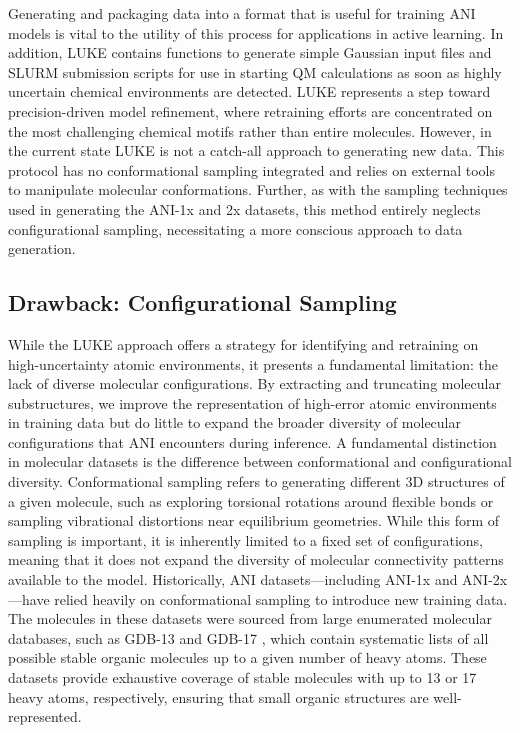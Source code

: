 Generating and packaging data into a format that is useful for training ANI models is vital to the utility of this process for applications in active learning.
In addition, LUKE contains functions to generate simple Gaussian \cite{gaussian16} input files and SLURM \cite{slurm} submission scripts for use in starting QM calculations as soon as highly uncertain chemical environments are detected.
LUKE represents a step toward precision-driven model refinement, where retraining efforts are concentrated on the most challenging chemical motifs rather than entire molecules. 
However, in the current state LUKE is not a catch-all approach to generating new data.
This protocol has no conformational sampling integrated and relies on external tools to manipulate molecular conformations.
Further, as with the sampling techniques used in generating the ANI-1x \cite{1x_1ccx_datasets} and 2x \cite{2x_dataset} datasets, this method entirely neglects configurational sampling, necessitating a more conscious approach to data generation.


\subsection{Drawback: Configurational Sampling}
\label{subsec:drawback_config_sampling}

While the LUKE approach offers a strategy for identifying and retraining on high-uncertainty atomic environments, it presents a fundamental limitation: the lack of diverse molecular configurations. 
By extracting and truncating molecular substructures, we improve the representation of high-error atomic environments in training data but do little to expand the broader diversity of molecular configurations that ANI encounters during inference. 
A fundamental distinction in molecular datasets is the difference between conformational and configurational diversity. 
Conformational sampling refers to generating different 3D structures of a given molecule, such as exploring torsional rotations around flexible bonds or sampling vibrational distortions near equilibrium geometries. While this form of sampling is important, it is inherently limited to a fixed set of configurations, meaning that it does not expand the diversity of molecular connectivity patterns available to the model.
Historically, ANI datasets—including ANI-1x \cite{1x_1ccx_datasets} and ANI-2x \cite{2x_dataset}—have relied heavily on conformational sampling to introduce new training data.
The molecules in these datasets were sourced from large enumerated molecular databases, such as GDB-13 \cite{gdb-13} and GDB-17 \cite{gdb-17}, which contain systematic lists of all possible stable organic molecules up to a given number of heavy atoms.
These datasets provide exhaustive coverage of stable molecules with up to 13 or 17 heavy atoms, respectively, ensuring that small organic structures are well-represented.


